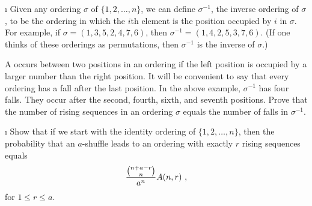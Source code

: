\exercises
\begin{LJSItem}
\i\label{exer 3.3.1} Given any ordering $\sigma$ of $\{1, 2, \ldots, n\}$, we can
define
$\sigma^{-1}$, the inverse ordering of $\sigma$, to be the ordering in which the
$i$th element is the position occupied by
$i$ in $\sigma$.  For example, if
$\sigma = (1, 3, 5, 2, 4, 7, 6)$, then $\sigma^{-1} = (1, 4, 2, 5, 3, 7, 6)$.  (If one
thinks of these orderings as permutations, then $\sigma^{-1}$ is the inverse of
$\sigma$.)
\par A  occurs between two positions in an ordering if the left 
position is occupied by a larger number than the right position.  It will be convenient
to say that every ordering has a fall after the last position.  In the above example,
$\sigma^{-1}$ has four falls.  They occur after the second, fourth, sixth, and seventh
positions.  Prove that the number of rising sequences in an ordering $\sigma$ equals
the number of falls in $\sigma^{-1}$.

\i\label{exer 3.3.2} Show that if we start with the identity ordering of $\{1, 2,
\ldots, n\}$, then the probability that an $a$-shuffle leads to an ordering with
exactly $r$ rising sequences equals
$${{{n + a - r}\choose{n}}\over{a^n}}A(n, r)\ ,$$ for $1 \le r \le a$.


\end{LJSItem}
